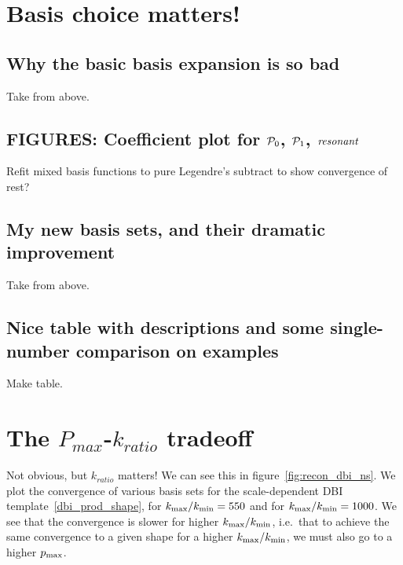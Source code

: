 \section{Basis choice matters!}
    \subsection{Why the basic basis expansion is so bad}
    Take from above.
    \subsection{FIGURES: Coefficient plot for $\mathcal{P}_0$, $\mathcal{P}_1$, $\textit{resonant}$}
    Refit mixed basis functions to pure Legendre's subtract to show convergence of rest?
    \newpage
    \subsection{My new basis sets, and their dramatic improvement}
    Take from above.
    \subsection{Nice table with descriptions and some single-number comparison on examples}
    Make table.
\section{The $P_{max}$-$k_{ratio}$ tradeoff}
    Not obvious, but $k_{ratio}$ matters!
    We can see this in figure~\ref{fig:recon_dbi_ns}.
    We plot the convergence of various basis sets for the scale-dependent
    DBI template~\eqref{dbi_prod_shape}, for ${k_\text{max}}/{k_\text{min}}=550$ and
    for ${k_\text{max}}/{k_\text{min}}=1000$. We see that the convergence is slower
    for higher ${k_\text{max}}/{k_\text{min}}$,  i.e.\ that to achieve the same convergence
    to a given shape for a higher ${k_\text{max}}/{k_\text{min}}$, we must also go to a higher $p_\text{max}$.
    \newpage
